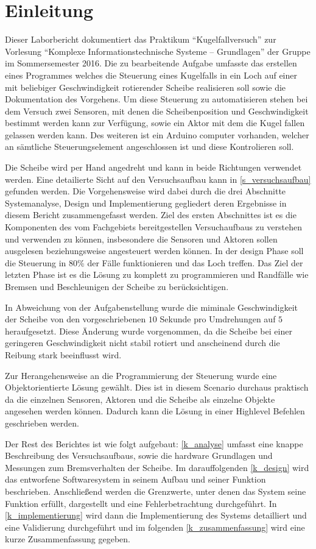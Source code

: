 \chapter{Einleitung}
Dieser Laborbericht dokumentiert das Praktikum \enquote{Kugelfallversuch} zur Vorlesung \enquote{Komplexe Informationstechnische Systeme -- Grundlagen} der Gruppe im Sommersemester 2016.
Die zu bearbeitende Aufgabe umfasste das erstellen eines Programmes welches die Steuerung eines Kugelfalls in ein Loch auf einer mit beliebiger Geschwindigkeit rotierender Scheibe realisieren soll sowie die Dokumentation des Vorgehens.
Um diese Steuerung zu automatisieren stehen bei dem Versuch zwei Sensoren, mit denen die Scheibenposition und Geschwindigkeit bestimmt werden kann zur Verfügung, sowie ein Aktor mit dem die Kugel fallen gelassen werden kann.
Des weiteren ist ein Arduino computer vorhanden, welcher an sämtliche Steuerungselement angeschlossen ist und diese Kontrolieren soll.

Die Scheibe wird per Hand angedreht und kann in beide Richtungen verwendet werden.
Eine detailierte Sicht auf den Versuchsaufbau kann in \cref{s_versuchsaufbau} gefunden werden.
Die Vorgehensweise wird dabei durch die drei Abschnitte Systemanalyse, Design und Implementierung gegliedert deren Ergebnisse in diesem Bericht zusammengefasst werden.
Ziel des ersten Abschnittes ist es die Komponenten des vom Fachgebiets bereitgestellen Versuchaufbaus zu verstehen und verwenden zu können, insbesondere die Sensoren und Aktoren sollen ausgelesen beziehungsweise angesteuert werden können.
In der design Phase soll die Steuerung in $80$\% der Fälle funktionieren und das Loch treffen.
Das Ziel der letzten Phase ist es die Lösung zu komplett zu programmieren und Randfälle wie Bremsen und Beschleunigen der Scheibe zu berücksichtigen.

In Abweichung von der Aufgabenstellung wurde die miminale Geschwindigkeit der Scheibe von den vorgeschriebenen $10$ Sekunde pro Umdrehungen auf $5$ heraufgesetzt.
Diese Änderung wurde vorgenommen, da die Scheibe bei einer geringeren Geschwindigkeit nicht stabil rotiert und anscheinend durch die Reibung stark beeinflusst wird. 

Zur Herangehensweise an die Programmierung der Steuerung wurde eine Objektorientierte Lösung gewählt.
Dies ist in diesem Scenario durchaus praktisch da die einzelnen Sensoren, Aktoren und die Scheibe als einzelne Objekte angesehen werden können.
Dadurch kann die Lösung in einer Highlevel Befehlen geschrieben werden.


Der Rest des Berichtes ist wie folgt aufgebaut:
\cref{k_analyse} umfasst eine knappe Beschreibung des Versuchsaufbaus, sowie die hardware Grundlagen und Messungen zum Bremsverhalten der Scheibe. 
Im darauffolgenden \cref{k_design} wird das entworfene Softwaresystem in seinem Aufbau und seiner Funktion beschrieben.
Anschließend werden die Grenzwerte, unter denen das System seine Funktion erfüllt, dargestellt und eine Fehlerbetrachtung durchgeführt.
In \cref{k_implementierung} wird dann die Implementierung des Systems detailliert und eine Validierung durchgeführt und im folgenden \cref{k_zusammenfassung} wird eine kurze Zusammenfassung gegeben.